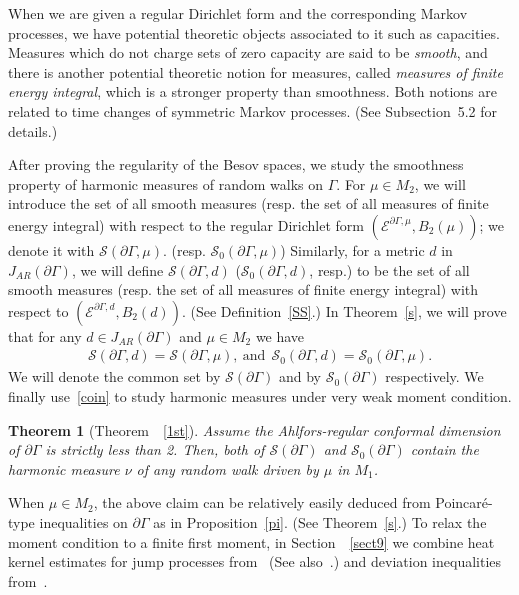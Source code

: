 \documentclass[AHL,Unicode,longabstracts,published]{cedram}
\newcommand{\ce}{\mathcal{E}}
\newcommand{\cs}{\mathcal{S}}
\newtheorem{innercustomthm}{Theorem}
\begin{document}
When we are given a regular Dirichlet form and the corresponding Markov processes, we have potential theoretic objects associated to it such as capacities. Measures which do not charge sets of zero capacity are said to be \emph{smooth}, and there is another potential theoretic notion for measures, called \emph{measures of finite energy integral}, which is a stronger property than smoothness. Both notions are related to time changes of symmetric Markov processes. (See Subsection~5.2 for details.)



After proving the regularity of the Besov spaces, we study the smoothness property of harmonic measures of random walks on $\Gamma$. For $\mu\in M_2$, we will introduce the set of all smooth measures (resp. the set of all measures of finite energy integral) with respect to the regular Dirichlet form $(\ce^{\partial\Gamma,\mu},B_2(\mu))$; we denote it with $\cs(\partial\Gamma,\mu)$. (resp. $\cs_0(\partial\Gamma,\mu)$) Similarly, for a metric $d$ in $J_{AR}(\partial\Gamma)$, we will define $\cs(\partial\Gamma,d)$ ($\cs_0(\partial\Gamma,d)$, resp.) to be the set of all smooth measures (resp. the set of all measures of finite energy integral) with respect to $(\ce^{\partial\Gamma,d},B_2(d))$. (See Definition~\ref{SS}.) In Theorem~\ref{s}, we will prove that for any $d\in J_{AR}(\partial\Gamma)$ and $\mu\in M_2$ we have
\begin{align}\label{coin}
\cs(\partial\Gamma,d)=\cs(\partial\Gamma,\mu),\ \text{and}\ \ \cs_0(\partial\Gamma,d)=\cs_0(\partial\Gamma,\mu).
\end{align}
We will denote the common set by $\cs(\partial\Gamma)$ and by $\cs_0(\partial\Gamma)$ respectively. We finally use~\eqref{coin} to study harmonic measures under very weak moment condition.


\begin{innercustomthm}[{Theorem~~\ref{1st}}]
Assume the Ahlfors-regular conformal dimension of $\partial\Gamma$ is strictly less than 2. Then, both of $\cs(\partial \Gamma)$ and $\cs_0(\partial\Gamma)$ contain the harmonic measure $\nu$ of any random walk driven by $\mu$ in $M_1$.
\end{innercustomthm}
When $\mu\in M_2$, the above claim can be relatively easily deduced from Poincaré-type inequalities on $\partial \Gamma$ as in Proposition~\ref{pi}. (See Theorem~\ref{s}.) To relax the moment condition to a finite first moment, in Section~~\ref{sect9} we combine heat kernel estimates for jump processes from~\cite{GHH} (See also~\cite{CK,CKW}.) and deviation inequalities from~\cite{MS}.
\end{document}
